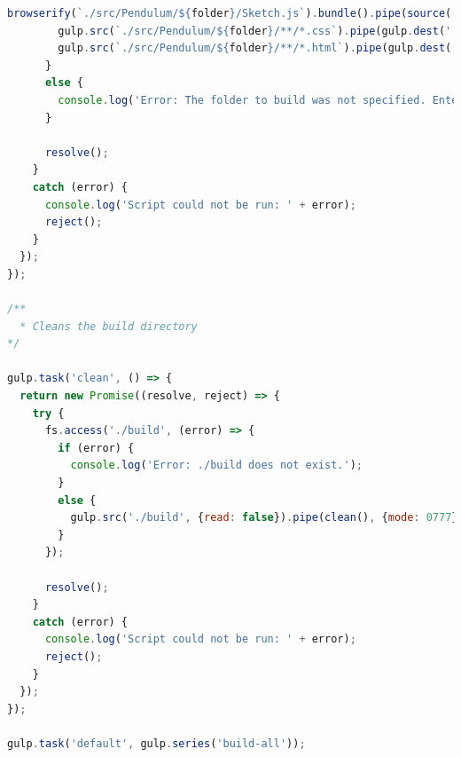 \documentclass[onecolumn, draftclsnofoot,10pt, compsoc]{IEEEtran}
\begin{document}
\begin{lstlisting}[language=JavaScript]
        browserify(`./src/Pendulum/${folder}/Sketch.js`).bundle().pipe(source('bundle.js')).pipe(gulp.dest('./build'), {mode: 0777});
        gulp.src(`./src/Pendulum/${folder}/**/*.css`).pipe(gulp.dest('./build'), {mode: 0777});
        gulp.src(`./src/Pendulum/${folder}/**/*.html`).pipe(gulp.dest('./build'), {mode: 0777});
      }
      else {
        console.log('Error: The folder to build was not specified. Enter the command gulp build --case [Your Case].');
      }

      resolve();
    }
    catch (error) {
      console.log('Script could not be run: ' + error);
      reject();
    }
  });
});

/**
  * Cleans the build directory
*/

gulp.task('clean', () => {
  return new Promise((resolve, reject) => {
    try {
      fs.access('./build', (error) => {
        if (error) {
          console.log('Error: ./build does not exist.');
        }
        else {
          gulp.src('./build', {read: false}).pipe(clean(), {mode: 0777});
        }
      });

      resolve();
    }
    catch (error) {
      console.log('Script could not be run: ' + error);
      reject();
    }
  });
});

gulp.task('default', gulp.series('build-all'));
\end{lstlisting}

\end{document}
